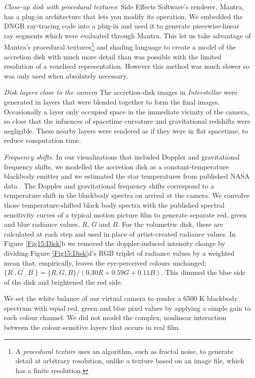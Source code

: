 \documentclass[12pt]{iopart}
\begin{document}
\emph{Close-up disk with procedural textures}:
Side Effects Software's renderer, Mantra, has a plug-in architecture that lets you modify its operation. We embedded the DNGR ray-tracing code into a plug-in and used it to generate piecewise-linear ray segments which were evaluated through Mantra. This let us take advantage of Mantra's procedural textures\footnote{A \emph{procedural texture}  uses an algorithm, such as fractal noise, to generate detail at arbitrary resolution, unlike a texture based on an image file, which has a finite resolution.} and shading language to create a model of the accretion disk with much more detail than was possible with the limited resolution of a voxelised representation. However this method was much slower so was only used when absolutely necessary.

\vskip1pc

\emph{Disk layers close to the camera}   
The  
accretion-disk images in \emph{Interstellar} were generated in
layers that were blended together to form the final images. Occasionally
a layer only occupied space in the immediate vicinity of the camera, so close that
the infuences of spacetime curvature and gravitational redshifts were negligible.
These nearby layers were 
rendered as if they were in flat spacetime, to reduce computation time.

\emph{Frequency shifts.} 
In our  visualizations that included Doppler and gravitational frequency shifts, we modelled the accretion disk as a constant-temperature blackbody
emitter and we estimated the star temperatures from published NASA data \cite{Tycho2}. The Doppler and gravitational frequency shifts correspond to
a temperature shift in the blackbody spectra on arrival at the camera. We convolve those temperature-shifted black body spectra with the published spectral sensitivity curves of a
typical motion picture film \cite{KODAK} to generate separate red, green and blue radiance values, $R$, $G$ and $B$.
For the volumetric disk, these are calculated at each step and used in place of
 artist-created radiance values. 
In Figure \ref{Fig15:Disk}b we removed the doppler-induced intensity change by dividing Figure \ref{Fig15:Disk}d's RGB triplet
of radiance values by a weighted mean that, empirically, leaves the eye-perceived colours unchanged:
$\{R^\prime, G^\prime, B^\prime\} = \{R,G,B\}/(0.30 R + 0.59 G + 0.11 B)$.  This dimmed the blue side of the disk and brightened the red side.   

We set the white balance of our virtual camera to render a 6500 K blackbody spectrum
with equal red, green and blue pixel values by applying a simple gain to each colour channel.
We did not model the complex, nonlinear interaction between the colour-sensitive layers that
occurs in real film.
\end{document}
